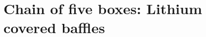\documentclass{tufte-handout}
\newcommand{\incfig}{\centering\includegraphics}
\begin{document}


\section{Chain of five boxes: Lithium covered baffles}
\end{document}
